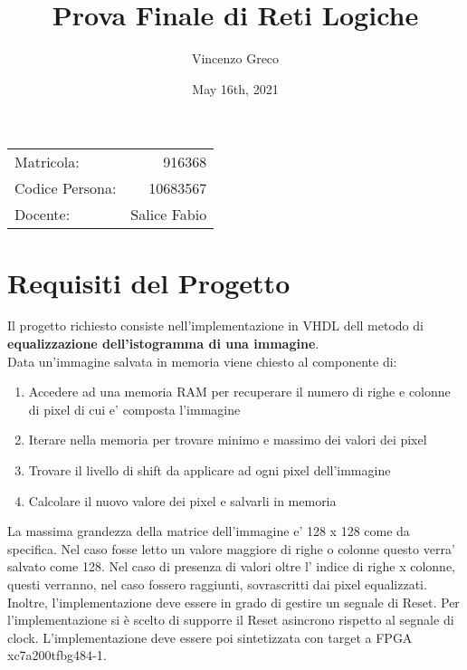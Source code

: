 \documentclass{article}
\title{Prova Finale di Reti Logiche} %
\author{Vincenzo Greco} %
\date{May 16th, 2021}
\begin{document}
\maketitle %
\begin{center}
\begin{tabular}{l r}
Matricola: & 916368\\ %
Codice Persona: & 10683567\\
Docente: & Salice Fabio	 %
\end{tabular}
\end{center}

\section{Requisiti del Progetto}

Il progetto richiesto consiste nell'implementazione in VHDL dell metodo di \textbf{
equalizzazione dell’istogramma di una immagine}.\\
Data un'immagine salvata in memoria viene chiesto al componente di:
\begin{enumerate}
\item Accedere ad una memoria RAM per recuperare il numero di righe e colonne di pixel di cui e' composta l'immagine
\item Iterare nella memoria per trovare minimo e massimo dei valori dei pixel
\item Trovare il livello di shift da applicare ad ogni pixel dell'immagine
\item Calcolare il nuovo valore dei pixel e salvarli in memoria
\end{enumerate}

La massima grandezza della matrice dell'immagine e' 128 x 128 come da specifica. Nel caso fosse letto un valore maggiore di righe o colonne questo verra' salvato come 128. Nel caso di presenza di valori oltre l' indice di righe x colonne, questi verranno, nel caso fossero raggiunti, sovrascritti dai pixel equalizzati.\\
Inoltre, l'implementazione deve essere in grado di gestire un segnale di Reset. Per l'implementazione si è scelto di supporre il Reset asincrono rispetto al segnale di clock. L'implementazione deve essere poi sintetizzata con target a FPGA xc7a200tfbg484-1.

\newpage
\noindent

\end{document}
